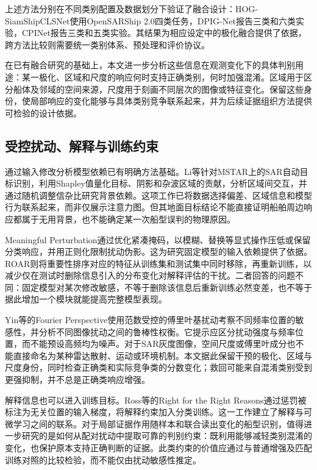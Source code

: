 上述方法分别在不同类别配置及数据划分下验证了融合设计：HOG-SiamShipCLSNet使用OpenSARShip 2.0四类任务，DPIG-Net报告三类和六类实验，CPINet报告三类和五类实验\cite{xie2023hogsiam,shao2023dpig,he2024cpinet}。其结果为相应设定中的极化融合提供了依据，跨方法比较则需要统一类别体系、预处理和评价协议。

在已有融合研究的基础上，本文进一步分析这些信息在观测变化下的具体判别用途：某一极化、区域和尺度的响应何时支持正确类别，何时加强混淆。区域用于区分船体及邻域的空间来源，尺度用于刻画不同层次的图像或特征变化。保留这些身份，使局部响应的变化能够与具体类别竞争联系起来，并为后续证据组织方法提供可检验的设计依据。

\subsection{受控扰动、解释与训练约束}

通过输入修改分析模型依赖已有明确方法基础。Li等针对MSTAR上的SAR自动目标识别，利用Shapley值量化目标、阴影和杂波区域的贡献，分析区域间交互，并通过随机调整信杂比研究背景依赖\cite{li2023noncausality}。这项工作已将数据选择偏差、区域信息和模型行为联系起来，而非仅展示注意力图。但其地面目标结论不能直接证明船舶周边响应都属于无用背景，也不能确定某一次船型误判的物理原因。

Meaningful Perturbation通过优化紧凑掩码，以模糊、替换等显式操作压低或保留分类响应，并用正则化限制扰动伪影\cite{fong2017meaningful}。这为研究固定模型的输入依赖提供了依据。ROAR则将重要性排序对应的特征从训练集和测试集中同时移除，再重新训练，以减少仅在测试时删除信息引入的分布变化对解释评估的干扰\cite{hooker2019roar}。二者回答的问题不同：固定模型对某次修改敏感，不等于删除该信息后重新训练必然变差，也不等于据此增加一个模块就能提高完整模型表现。

Yin等的Fourier Perspective使用范数受控的傅里叶基扰动考察不同频率位置的敏感性，并分析不同图像扰动之间的鲁棒性权衡\cite{yin2019fourier}。它提示应区分扰动强度与频率位置，而不能预设高频均为噪声。对于SAR灰度图像，空间尺度或傅里叶成分也不能直接命名为某种雷达散射、运动或环境机制。本文据此保留干预的极化、区域与尺度身份，同时检查正确类和实际竞争类的分数变化；救回可能来自混淆类别受到更强抑制，并不总是正确类响应增强。

解释信息也可以进入训练目标。Ross等的Right for the Right Reasons通过惩罚被标注为无关位置的输入梯度，将解释约束加入分类训练\cite{ross2017right}。这一工作建立了解释与可微学习之间的联系。对于局部证据作用随样本和联合读出变化的船型识别，值得进一步研究的是如何从配对扰动中提取可靠的判别约束：既利用能够减轻类别混淆的变化，也保护原本支持正确判断的证据。此类约束的价值应通过与普通增强及匹配训练对照的比较检验，而不能仅由扰动敏感性推定。

